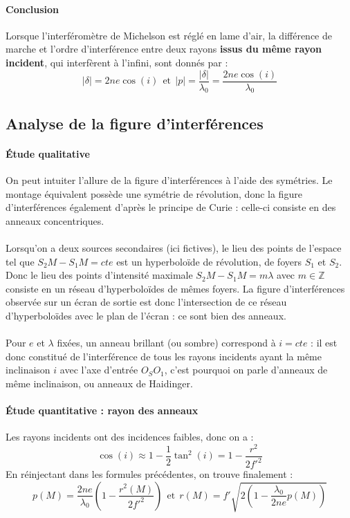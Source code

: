\documentclass[french]{book}
\theoremstyle{plain}
\theoremstyle{definition}
\theoremstyle{remark}
\newcommand{\Z}{\mathbb{Z}}
\begin{document}
\paragraph{Conclusion} Lorsque l'interféromètre de Michelson est réglé en lame d'air, la différence de marche et l'ordre d'interférence entre deux rayons \textbf{issus du même rayon incident}, qui interfèrent à l'infini, sont donnés par : $$\lvert\delta\rvert=2ne\cos(i) \ \ \text{et} \ \ \lvert p\rvert=\frac{\lvert\delta\rvert}{\lambda_0}=\frac{2ne\cos(i)}{\lambda_0}$$
\subsection{Analyse de la figure d'interférences}
\paragraph{Étude qualitative}
On peut intuiter l'allure de la figure d'interférences à l'aide des symétries. Le montage équivalent possède une symétrie de révolution, donc la figure d'interférences également d'après le principe de Curie : celle-ci consiste en des anneaux concentriques. \\ \\ Lorsqu'on a deux sources secondaires (ici fictives), le lieu des points de l'espace tel que $S_2M-S_1M=cte$ est un hyperboloïde de révolution, de foyers $S_1$ et $S_2$. Donc le lieu des points d'intensité maximale $S_2M-S_1M=m\lambda$ avec $m\in\Z$ consiste en un réseau d'hyperboloïdes de mêmes foyers. La figure d'interférences observée sur un écran de sortie est donc l'intersection de ce réseau d'hyperboloïdes avec le plan de l'écran : ce sont bien des anneaux. \\ \\  Pour $e$ et $\lambda$ fixées, un anneau brillant (ou sombre) correspond à $i=cte$ : il est donc constitué de l'interférence de tous les rayons incidents ayant la même inclinaison $i$ avec l'axe d'entrée $O_SO_1$, c'est pourquoi on parle d'anneaux de même inclinaison, ou anneaux de Haidinger.
\paragraph{Étude quantitative : rayon des anneaux} Les rayons incidents ont des incidences faibles, donc on a : $$\cos(i)\approx 1-\frac{1}{2}\tan^2(i)=1-\frac{r^2}{2f'^2}$$ En réinjectant dans les formules précédentes, on trouve finalement : $$p(M)=\frac{2ne}{\lambda_0}\left(1-\frac{r^2(M)}{2f'^2}\right) \ \ \text{et} \ \ r(M)=f'\sqrt{2\left(1-\frac{\lambda_0}{2ne}p(M)\right)}$$
\end{document}
